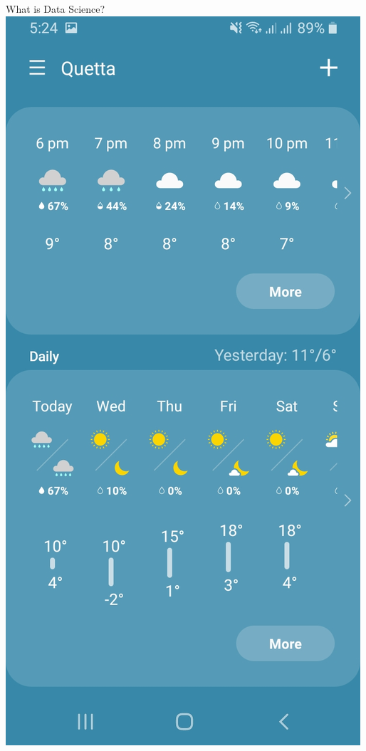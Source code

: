 \begin{frame}{What is Data Science?}
\protect\hypertarget{what-is-data-science}{}
\includegraphics{images/weather.jpeg}

\end{frame}

